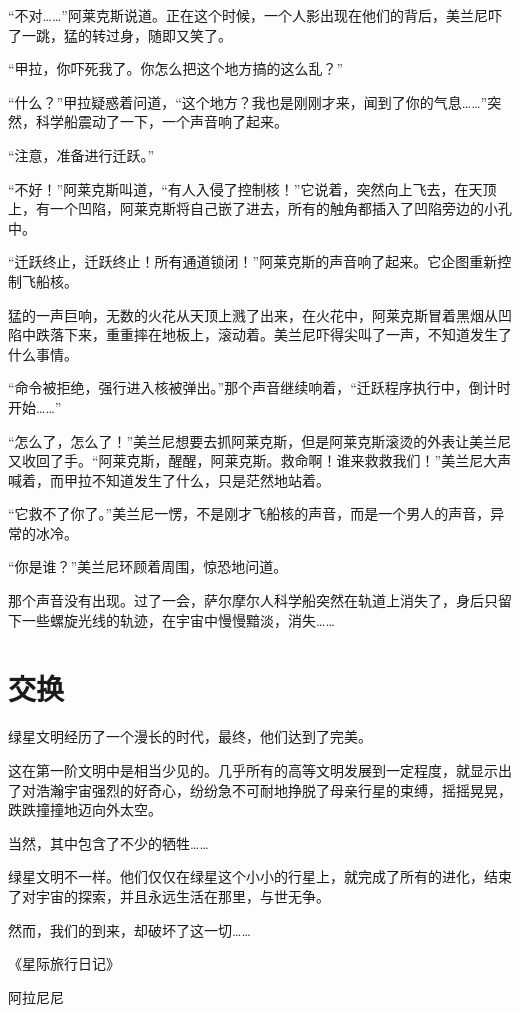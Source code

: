 “不对……”阿莱克斯说道。正在这个时候，一个人影出现在他们的背后，美兰尼吓了一跳，猛的转过身，随即又笑了。

“甲拉，你吓死我了。你怎么把这个地方搞的这么乱？”

“什么？”甲拉疑惑着问道，“这个地方？我也是刚刚才来，闻到了你的气息……”突然，科学船震动了一下，一个声音响了起来。

“注意，准备进行迁跃。”

“不好！”阿莱克斯叫道，“有人入侵了控制核！”它说着，突然向上飞去，在天顶上，有一个凹陷，阿莱克斯将自己嵌了进去，所有的触角都插入了凹陷旁边的小孔中。

“迁跃终止，迁跃终止！所有通道锁闭！”阿莱克斯的声音响了起来。它企图重新控制飞船核。

猛的一声巨响，无数的火花从天顶上溅了出来，在火花中，阿莱克斯冒着黑烟从凹陷中跌落下来，重重摔在地板上，滚动着。美兰尼吓得尖叫了一声，不知道发生了什么事情。

“命令被拒绝，强行进入核被弹出。”那个声音继续响着，“迁跃程序执行中，倒计时开始……”

“怎么了，怎么了！”美兰尼想要去抓阿莱克斯，但是阿莱克斯滚烫的外表让美兰尼又收回了手。“阿莱克斯，醒醒，阿莱克斯。救命啊！谁来救救我们！”美兰尼大声喊着，而甲拉不知道发生了什么，只是茫然地站着。

“它救不了你了。”美兰尼一愣，不是刚才飞船核的声音，而是一个男人的声音，异常的冰冷。

“你是谁？”美兰尼环顾着周围，惊恐地问道。

那个声音没有出现。过了一会，萨尔摩尔人科学船突然在轨道上消失了，身后只留下一些螺旋光线的轨迹，在宇宙中慢慢黯淡，消失……

\chapter{交换}

绿星文明经历了一个漫长的时代，最终，他们达到了完美。

这在第一阶文明中是相当少见的。几乎所有的高等文明发展到一定程度，就显示出了对浩瀚宇宙强烈的好奇心，纷纷急不可耐地挣脱了母亲行星的束缚，摇摇晃晃，跌跌撞撞地迈向外太空。

当然，其中包含了不少的牺牲……

绿星文明不一样。他们仅仅在绿星这个小小的行星上，就完成了所有的进化，结束了对宇宙的探索，并且永远生活在那里，与世无争。

然而，我们的到来，却破坏了这一切……

《星际旅行日记》

阿拉尼尼


